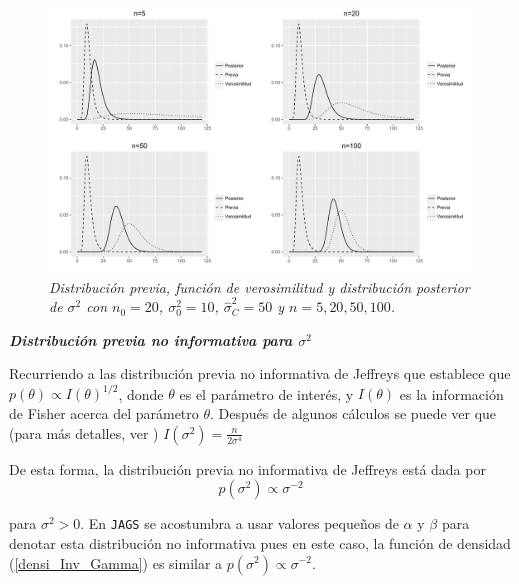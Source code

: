 \documentclass[10pt,openright]{book}\usepackage[]{graphicx}\usepackage[]{color}
\begin{document}
    \begin{figure}[!h]
    \centering
    \includegraphics[scale=0.5]{Sigma2_compara.pdf}
    \caption{\emph{Distribuci\'on previa, funci\'on de verosimilitud y distribuci\'on posterior de $\sigma^2$ con $n_0=20$, $\sigma^2_0=10$, $\hat{\sigma}^2_C=50$ y $n=5,20,50,100$.}}
    \label{Posterior_Sigma2}
    \end{figure}
    
    \textbf{\emph{Distribuci\'on previa no informativa para $\sigma^2$}}
    
    Recurriendo a las distribuci\'on previa no informativa de Jeffreys que establece que $p(\theta)\propto I(\theta) ^{1/2}$, donde $\theta$ es el par\'ametro de inter\'es, y $I(\theta)$ es la informaci\'on de Fisher acerca del par\'ametro $\theta$. Despu\'es de algunos c\'alculos se puede ver que (para m\'as detalles, ver ) $I(\sigma^2)=\frac{n}{2\sigma^4}$
    
    De esta forma, la distribuci\'on previa no informativa de Jeffreys est\'a dada por 
    \begin{equation*}
    p(\sigma^2)\propto \sigma^{-2}
    \end{equation*}
    
    para $\sigma^2>0$. En \verb'JAGS' se acostumbra a usar valores peque\~nos de $\alpha$ y $\beta$ para denotar esta distribuci\'on no informativa pues en este caso, la funci\'on de densidad (\ref{densi_Inv_Gamma}) es similar a $p(\sigma^2)\propto \sigma^{-2}$. 
    
\end{document}
